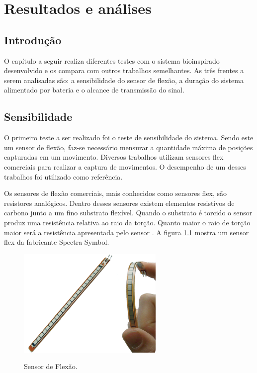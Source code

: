 \documentclass[
	12pt,				%
	openright,			%
	oneside,			%
	a4paper,			%
	english,			%
	brazil				%
	]{abntex2}
\begin{document}




\chapter{Resultados e análises}

		\section{Introdução}

		O capítulo a seguir realiza diferentes testes com o sistema bioinspirado desenvolvido e os compara com outros trabalhos semelhantes. As três frentes a serem analisadas são: a sensibilidade do sensor de flexão, a duração do sistema alimentado por bateria e o alcance de transmissão do sinal.
		

		\section{Sensibilidade}

		O primeiro teste a ser realizado foi o teste de sensibilidade do sistema. Sendo este um sensor de flexão, faz-se necessário mensurar a quantidade máxima de posições capturadas em um movimento. Diversos trabalhos utilizam sensores flex comerciais para realizar a captura de movimentos. O desempenho de um desses trabalhos foi utilizado como referência.

		Os sensores de flexão comerciais, mais conhecidos como sensores flex, são resistores analógicos. Dentro desses sensores existem elementos resistivos de carbono junto a um fino substrato flexível. Quando o substrato é torcido o sensor produz uma resistência relativa ao raio da torção. Quanto maior o raio de torção maior será a resistência apresentada pelo sensor \cite{solanki2013sign}. A figura \ref{Fig:flex-sensor1} mostra um sensor flex da fabricante Spectra Symbol.

	\begin{figure}[!h]
		\centering
		\caption{Sensor de Flexão.}
		\includegraphics[width=7cm,keepaspectratio=true]{./figures/flex-sensor1.png}
		\label{Fig:flex-sensor1}
	\end{figure}
\end{document}
